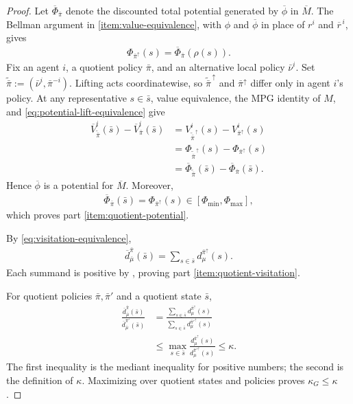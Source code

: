 \documentclass{article}
\theoremstyle{plain}
\theoremstyle{definition}
\theoremstyle{remark}
\newcommand{\quotient}[1]{\overline{#1}}
\newcommand{\Vbar}{\overline{V}}
\newcommand{\dbar}{\overline{d}}
\newcommand{\Potbar}{\overline{\Phi}}
\newcommand{\Mbar}{\kappa_G}
\begin{document}
\begin{proof}
Let $\Potbar_{\bar\pi}$ denote the discounted total potential generated by
$\quotient\phi$ in $\quotient M$. The Bellman argument in
\ref{item:value-equivalence}, with $\phi$ and
$\quotient\phi$ in place of $r^i$ and $\quotient r^{\,i}$, gives
\begin{align}
  \Phi_{\bar\pi^\uparrow}(s)
  =
  \Potbar_{\bar\pi}(\rho(s)).
  \label{eq:potential-lift-equivalence}
\end{align}
Fix an agent $i$, a quotient policy $\bar\pi$, and an alternative local policy
$\bar\nu^i$. Set
$\widetilde{\bar\pi}:=(\bar\nu^i,\bar\pi^{-i})$. Lifting acts coordinatewise, so
$\widetilde{\bar\pi}^{\,\uparrow}$ and $\bar\pi^\uparrow$ differ only in agent
$i$'s policy. At any representative $s\in\bar s$, value equivalence, the MPG
identity of $M$, and \eqref{eq:potential-lift-equivalence} give
\begin{align*}
  \Vbar^i_{\widetilde{\bar\pi}}(\bar s)
  -
  \Vbar^i_{\bar\pi}(\bar s)
  &=
  V^i_{\widetilde{\bar\pi}^{\,\uparrow}}(s)
  -
  V^i_{\bar\pi^\uparrow}(s)\\
  &=
  \Phi_{\widetilde{\bar\pi}^{\,\uparrow}}(s)
  -
  \Phi_{\bar\pi^\uparrow}(s)\\
  &=
  \Potbar_{\widetilde{\bar\pi}}(\bar s)
  -
  \Potbar_{\bar\pi}(\bar s).
\end{align*}
Hence $\quotient\phi$ is a potential for $\quotient M$. Moreover,
\begin{align*}
  \Potbar_{\bar\pi}(\bar s)
  =
  \Phi_{\bar\pi^\uparrow}(s)
  \in
  [\Phi_{\min},\Phi_{\max}],
\end{align*}
which proves part \ref{item:quotient-potential}.

By \eqref{eq:visitation-equivalence},
\begin{align*}
  \dbar^{\bar\pi}_{\quotient\mu}(\bar s)
  =
  \sum_{s\in\bar s}d^{\bar\pi^\uparrow}_\mu(s).
\end{align*}
Each summand is positive by , proving part
\ref{item:quotient-visitation}.

For quotient policies $\bar\pi,\bar\pi'$ and a quotient state $\bar s$,
\begin{align*}
  \frac{
    \dbar^{\bar\pi}_{\quotient\mu}(\bar s)
  }{
    \dbar^{\bar\pi'}_{\quotient\mu}(\bar s)
  }
  &=
  \frac{
    \sum_{s\in\bar s}d^{\bar\pi^\uparrow}_\mu(s)
  }{
    \sum_{s\in\bar s}d^{\bar\pi'^\uparrow}_\mu(s)
  }\\
  &\le
  \max_{s\in\bar s}
  \frac{
    d^{\bar\pi^\uparrow}_\mu(s)
  }{
    d^{\bar\pi'^\uparrow}_\mu(s)
  }
  \le\kappa.
\end{align*}
The first inequality is the mediant inequality for positive numbers; the second
is the definition of $\kappa$. Maximizing over quotient states and policies proves
$\Mbar\le\kappa$.
\end{proof}
\end{document}

